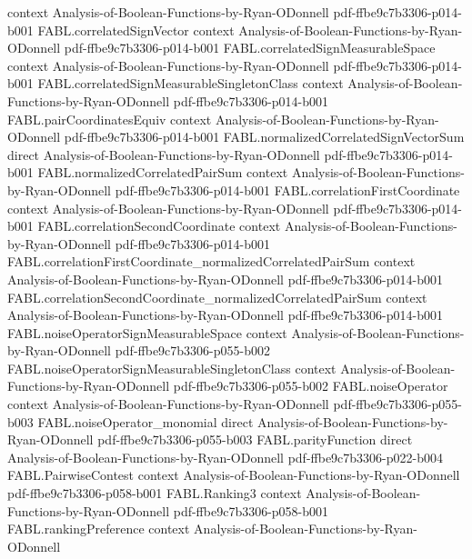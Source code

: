 \begin{theorem}
  {context}
  {Analysis-of-Boolean-Functions-by-Ryan-ODonnell}
  {pdf-ffbe9c7b3306-p014-b001}
\proofstep
  {FABL.correlatedSignVector}
  {context}
  {Analysis-of-Boolean-Functions-by-Ryan-ODonnell}
  {pdf-ffbe9c7b3306-p014-b001}
\proofstep
  {FABL.correlatedSignMeasurableSpace}
  {context}
  {Analysis-of-Boolean-Functions-by-Ryan-ODonnell}
  {pdf-ffbe9c7b3306-p014-b001}
\proofstep
  {FABL.correlatedSignMeasurableSingletonClass}
  {context}
  {Analysis-of-Boolean-Functions-by-Ryan-ODonnell}
  {pdf-ffbe9c7b3306-p014-b001}
\proofstep
  {FABL.pairCoordinatesEquiv}
  {context}
  {Analysis-of-Boolean-Functions-by-Ryan-ODonnell}
  {pdf-ffbe9c7b3306-p014-b001}
\proofstep
  {FABL.normalizedCorrelatedSignVectorSum}
  {direct}
  {Analysis-of-Boolean-Functions-by-Ryan-ODonnell}
  {pdf-ffbe9c7b3306-p014-b001}
\proofstep
  {FABL.normalizedCorrelatedPairSum}
  {context}
  {Analysis-of-Boolean-Functions-by-Ryan-ODonnell}
  {pdf-ffbe9c7b3306-p014-b001}
\proofstep
  {FABL.correlationFirstCoordinate}
  {context}
  {Analysis-of-Boolean-Functions-by-Ryan-ODonnell}
  {pdf-ffbe9c7b3306-p014-b001}
\proofstep
  {FABL.correlationSecondCoordinate}
  {context}
  {Analysis-of-Boolean-Functions-by-Ryan-ODonnell}
  {pdf-ffbe9c7b3306-p014-b001}
\proofstep
  {FABL.correlationFirstCoordinate_normalizedCorrelatedPairSum}
  {context}
  {Analysis-of-Boolean-Functions-by-Ryan-ODonnell}
  {pdf-ffbe9c7b3306-p014-b001}
\proofstep
  {FABL.correlationSecondCoordinate_normalizedCorrelatedPairSum}
  {context}
  {Analysis-of-Boolean-Functions-by-Ryan-ODonnell}
  {pdf-ffbe9c7b3306-p014-b001}
\proofstep
  {FABL.noiseOperatorSignMeasurableSpace}
  {context}
  {Analysis-of-Boolean-Functions-by-Ryan-ODonnell}
  {pdf-ffbe9c7b3306-p055-b002}
\proofstep
  {FABL.noiseOperatorSignMeasurableSingletonClass}
  {context}
  {Analysis-of-Boolean-Functions-by-Ryan-ODonnell}
  {pdf-ffbe9c7b3306-p055-b002}
\proofstep
  {FABL.noiseOperator}
  {context}
  {Analysis-of-Boolean-Functions-by-Ryan-ODonnell}
  {pdf-ffbe9c7b3306-p055-b003}
\proofstep
  {FABL.noiseOperator_monomial}
  {direct}
  {Analysis-of-Boolean-Functions-by-Ryan-ODonnell}
  {pdf-ffbe9c7b3306-p055-b003}
\proofstep
  {FABL.parityFunction}
  {direct}
  {Analysis-of-Boolean-Functions-by-Ryan-ODonnell}
  {pdf-ffbe9c7b3306-p022-b004}
\proofstep
  {FABL.PairwiseContest}
  {context}
  {Analysis-of-Boolean-Functions-by-Ryan-ODonnell}
  {pdf-ffbe9c7b3306-p058-b001}
\proofstep
  {FABL.Ranking3}
  {context}
  {Analysis-of-Boolean-Functions-by-Ryan-ODonnell}
  {pdf-ffbe9c7b3306-p058-b001}
\proofstep
  {FABL.rankingPreference}
  {context}
  {Analysis-of-Boolean-Functions-by-Ryan-ODonnell}

\end{theorem}

